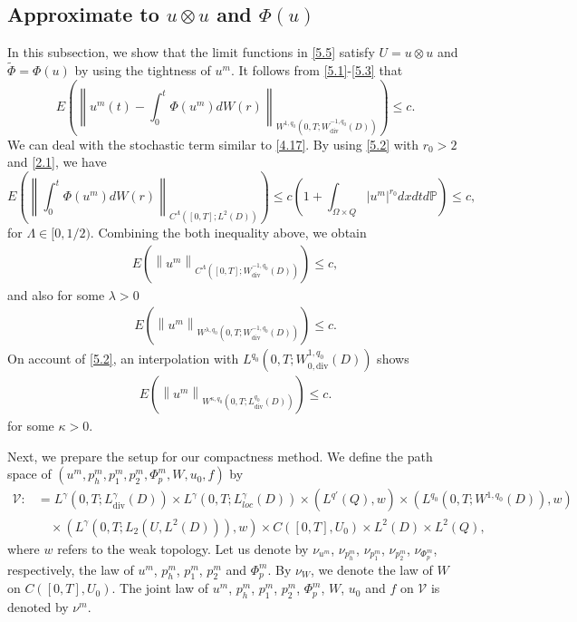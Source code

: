 \documentclass[reqno]{amsart}
\theoremstyle{definition}
\theoremstyle{remark}
\numberwithin{equation}{section} \allowdisplaybreaks
\begin{document}
\subsection{Approximate to $u\otimes u$ and $\Phi(u)$}
In this subsection, we  show that the limit functions in \eqref{5.5}
satisfy $U=u\otimes u$ and $\tilde{\Phi}=\Phi(u)$ by using the
tightness of $u^m$. %
It follows from \eqref{5.1}-\eqref{5.3} that
$$E\left(\left\|u^m(t)-\int_0^t\Phi(u^m)dW(r)\right\|_{W^{1,q_0}(0,T;W^{-1,q_0}_{\text{div}}(D))}\right)\leq c.$$
We can deal with the stochastic term similar to \eqref{4.17}. By
using \eqref{5.2} with $r_0>2$ and \eqref{2.1}, we have
$$E\left(\left\|\int_0^t\Phi(u^m)dW(r)\right\|_{C^{\Lambda}([0,T];L^2(D))}\right)\leq c\left(1+\int_{\Omega\times Q}|u^m|^{r_0}dxdtd\mathbb{P}\right)\leq c,$$
for $\Lambda\in[0,1/2)$. Combining the both inequality above, we
obtain
\begin{equation}\label{5.25}
\begin{split}
E\left(\left\|u^m\right\|_{C^{\Lambda}([0,T];W^{-1,q_0}_{\text{div}}(D))}\right)\leq
c,
\end{split}
\end{equation}
and also for some $\lambda>0$
\begin{equation}\label{5.26}
\begin{split}
E\left(\left\|u^m\right\|_{W^{\lambda,q_0}(0,T;W^{-1,q_0}_{\text{div}}(D))}\right)\leq
c.
\end{split}
\end{equation}
On account of \eqref{5.2}, an interpolation
with $L^{q_0}(0,T;W^{1,q_0}_{0,\text{div}}(D))$ shows
\begin{equation}\label{5.27}
\begin{split}
E\left(\left\|u^m\right\|_{W^{\kappa,q_0}(0,T;L^{q_0}_{\text{div}}(D))}\right)\leq
c.
\end{split}
\end{equation}
for some $\kappa>0$.

Next, we prepare the setup for our compactness method. We define the
path space of $(u^m,p_h^m,p_1^m,p_2^m,\Phi_p^m,W,u_0,f)$ by
\begin{equation*}
\begin{split}
\mathcal{V}:&=L^\gamma(0,T;L^\gamma_{\text{div}}(D))\times L^\gamma(0,T;L^\gamma_{loc}(D))\times(L^{q'}(Q),w)\times (L^{q_0}(0,T;W^{1,q_0}(D)),w)\\
&\quad\times (L^\gamma(0,T;L_2({U},L^2(D))),w)\times
C([0,T],{U}_0)\times L^2(D)\times L^2(Q),
\end{split}
\end{equation*}
where $w$ refers to the weak topology. Let us denote by $\nu_{u^m}$,
$\nu_{p_h^m}$, $\nu_{p_1^m}$, $\nu_{p_2^m}$, $\nu_{\Phi_p^m}$,
respectively,  the law of $u^m$, $p_h^m$, $p_1^m$, $p_2^m$ and
$\Phi_p^m$. By $\nu_{W}$, we denote the law of $W$ on
$C([0,T],{U}_0)$. The joint law of $u^m$, $p_h^m$, $p_1^m$, $p_2^m$,
$\Phi_p^m$, $W$, $u_0$ and $f$ on $\mathcal{V}$ is denoted by
$\nu^m$.
\end{document}
